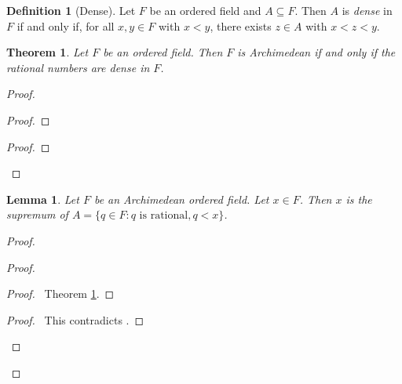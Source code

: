 \documentclass{article}
\let\qed\relax
\newtheorem{lemma}[axiom]{Lemma}
\newtheorem{theorem}[axiom]{Theorem}
\theoremstyle{definition}
\newtheorem{definition}[axiom]{Definition}
\begin{document}
    \begin{definition}[Dense]
        Let $F$ be an ordered field and $A \subseteq F$. Then $A$ is \emph{dense} in $F$ if and only if,
        for all $x, y \in F$ with $x < y$, there exists $z \in A$ with $x < z < y$.
    \end{definition}

    \begin{theorem}
        \label{theorem:rationals_dense}
        Let $F$ be an ordered field. Then $F$ is Archimedean if and only if the rational numbers are dense
        in $F$.
    \end{theorem}

    \begin{proof}
        \pf
        \begin{proof}
        \end{proof}
        \begin{proof}
        \end{proof}
        \qed
    \end{proof}

    \begin{lemma}
        \label{lm:sup_of_rationals}
        Let $F$ be an Archimedean ordered field. Let $x \in F$. Then $x$ is the supremum of
        $A = \{ q \in F : q \text{ is rational}, q < x \}$.
    \end{lemma}

    \begin{proof}
        \pf
        \begin{proof}
            \begin{proof}
                \pf\ Theorem \ref{theorem:rationals_dense}.
            \end{proof}
            \qedstep
            \begin{proof}
                \pf\ This contradicts .
            \end{proof}
        \end{proof}
        \qed
    \end{proof}
\end{document}
